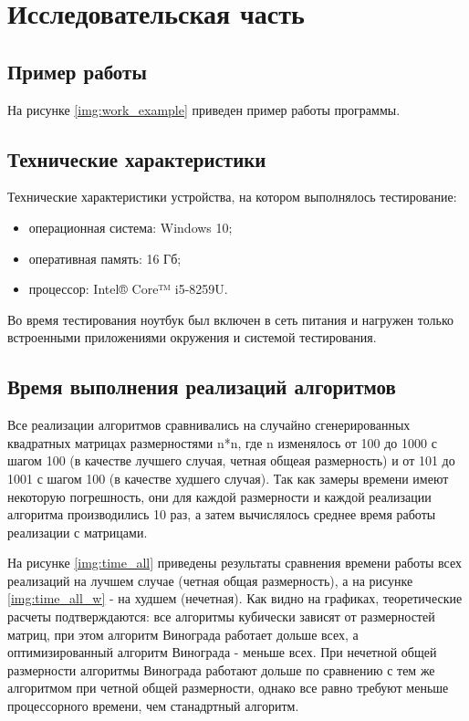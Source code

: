 \chapter{Исследовательская часть}

\section{Пример работы}

На рисунке \ref{img:work_example} приведен пример работы программы.


\section{Технические характеристики}

Технические характеристики устройства, на котором выполнялось тестирование:

\begin{itemize}
	\item операционная система: Windows 10;
	\item оперативная память: 16 Гб;
	\item процессор: Intel® Core™ i5-8259U.
\end{itemize}

Во время тестирования ноутбук был включен в сеть питания и нагружен только встроенными приложениями окружения и системой тестирования.

\section{Время выполнения реализаций алгоритмов}

 Все реализации алгоритмов сравнивались на случайно сгенерированных квадратных матрицах размерностями n*n, где n изменялось от 100 до 1000 с шагом 100 (в качестве лучшего случая, четная общеая размерность) и от 101 до 1001 с шагом 100 (в качестве худшего случая). Так как замеры времени имеют некоторую погрешность, они для каждой размерности и каждой реализации алгоритма производились 10 раз, а затем вычислялось среднее время работы реализации с матрицами.
 
На рисунке \ref{img:time_all} приведены результаты сравнения времени работы всех реализаций на лучшем случае (четная общая размерность), а на рисунке \ref{img:time_all_w} - на худшем (нечетная). Как видно на графиках, теоретические расчеты подтверждаются: все алгоритмы кубически зависят от размерностей матриц, при этом алгоритм Винограда работает дольше всех, а оптимизированный алгоритм Винограда - меньше всех. При нечетной общей размерности алгоритмы Винограда работают дольше по сравнению с тем же алгоритмом при четной общей размерности, однако все равно требуют меньше процессорного времени, чем станадртный алгоритм.

